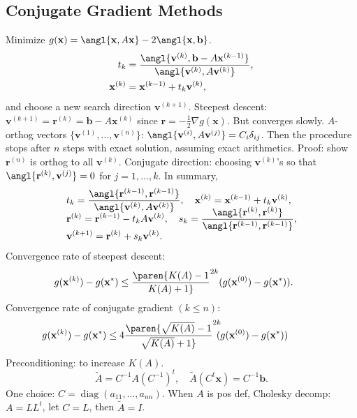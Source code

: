 \documentclass[b4paper,10pt]{memoir}
\begin{document}
\begin{multicols*}{3}
    \section{Conjugate Gradient Methods}
    \s Minimize $g(\mathbf x) = \angl{\mathbf x,A\mathbf x} - 2\angl{\mathbf x ,\mathbf b}$.\nl
    \s\begin{align*}
        t_k             & = \frac{\angl{ \mathbf v^{(k)}, \mathbf b - A \mathbf x ^{(k-1)} }}{\angl { \mathbf v^{(k)}, A\mathbf v^{(k)} }  }, \\
        \mathbf x^{(k)} & = \mathbf x^{(k-1)} + t_k \mathbf v^{(k)},
    \end{align*}
    and choose a new search direction $\mathbf v^{(k+1)}$. \nl
    \s Steepest descent: $\mathbf v^{(k+1)} = \mathbf r^{(k)} = \mathbf b - A\mathbf x^{(k)}$ since $\mathbf r = -\frac 12 \nabla g(\mathbf x)$. But converges slowly. \nl
    \s $A$-orthog vectors $\{\mathbf v^{(1)},\dots,\mathbf v^{(n)}\}$: $\angl{\mathbf v^{(i)},A\mathbf v^{(j)}} = C_i\delta_{ij}$. Then the procedure stops after $n$ steps with exact solution, assuming exact arithmetics. \nl
    Proof: show $\mathbf r^{(n)}$ is orthog to all $\mathbf v^{(k)}$. \nl
    \s Conjugate direction: choosing $\mathbf v^{(k)}$'s so that $\angl{\mathbf r^{(k)}, \mathbf v^{(j)}} = 0$ for $j=1,\dots,k$. In summary,
    \begin{align*}
         & t_k = \frac{\angl{ \mathbf r^{(k-1)}, \mathbf r^{(k-1)} }}{\angl{\mathbf v^{(k)} , A\mathbf v^{(k)}}},\quad \mathbf x^{(k)} = \mathbf x^{(k-1)} + t_k\mathbf v^{(k)},   \\[-10pt]
         & \mathbf r^{(k)} = \mathbf r^{(k-1)} - t_k A\mathbf v^{(k)},\quad s_k = \frac{\angl{\mathbf r^{(k)}, \mathbf r^{(k)}}}{\angl{ \mathbf r^{(k-1)}, \mathbf r^{(k-1)} }  }, \\[-5pt]
         & \mathbf v^{(k+1)} = \mathbf r^{(k)} + s_k\mathbf v^{(k)}.
    \end{align*}
    \s Convergence rate of steepest descent:
    \[\mkern-30mu g(\mathbf x^{(k)}) - g(\mathbf x^*)  \le \paren{K(A) - 1\over K(A)+1}^{2k} (g(\mathbf x^{(0)} ) - g(\mathbf x^*)).\]
    \s Convergence rate of conjugate gradient $(k\le n)$:
    \[ \mkern-60mu g(\mathbf x^{(k)}) - g(\mathbf x^*)  \le 4\paren{\sqrt{K(A)} - 1\over \sqrt{K(A)}+1}^{2k}\!\!\! (g(\mathbf x^{(0)} ) - g(\mathbf x^*))\]
    \s Preconditioning: to increase $K(A)$.
    \[ \tilde A = C^{-1}A(C^{-1})^t,\quad \tilde A (C^t\mathbf x) = C^{-1}\mathbf b. \]
    \s One choice: $C = \operatorname{diag}(a_{11},\dots,a_{nn})$.\nl
    \s When $A$ is pos def, Cholesky decomp: $A=LL^t$, let $C=L$, then $\tilde A = I$.


\end{multicols*}
\end{document}
